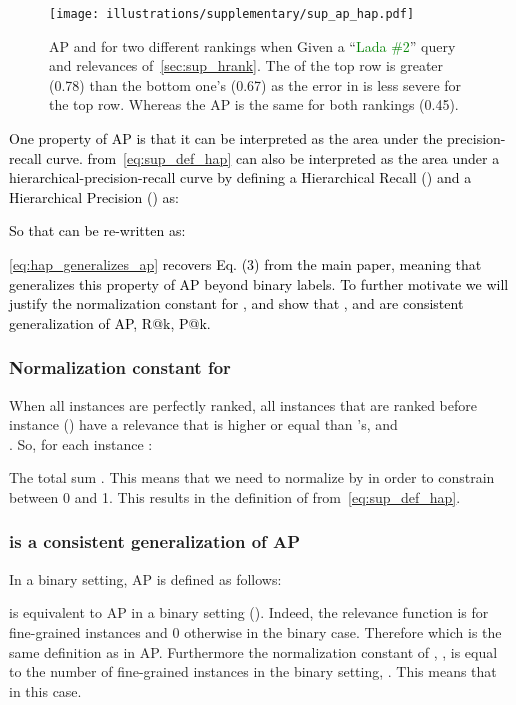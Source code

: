 \begin{figure}[t]
    \centering
    \texttt{[image: illustrations/supplementary/sup\_ap\_hap.pdf]}
    \caption{AP and  for two different rankings when Given a ``\textcolor{Green}{Lada \#2}'' \textcolor{amethyst}{query} and relevances of~\cref{sec:sup_hrank}. The  of the top row is greater (0.78) than the bottom one's (0.67) as the error in  is less severe for the top row. Whereas the AP is the same for both rankings (0.45).}
    \label{fig:sup_dif_ap_hap}
\end{figure}

\medbreak

\textcolor{black}{One property of AP is that it can be interpreted as the area under the precision-recall curve.  from~\cref{eq:sup_def_hap} can also be interpreted as the area under a hierarchical-precision-recall curve by defining a Hierarchical Recall () and a Hierarchical Precision () as:}



\textcolor{black}{So that  can be re-written as:}


\textcolor{black}{\cref{eq:hap_generalizes_ap} recovers Eq. (3) from the main paper, meaning that  generalizes this property of AP beyond binary labels. To further motivate  we will justify the normalization constant for , and show that ,  and  are consistent generalization of AP, R@k, P@k.}


\subsubsection{Normalization constant for } When all instances are perfectly ranked, all instances  that are ranked before instance  () have a relevance that is higher or equal than 's, \ie  and \\ . So, for each instance :


The total sum . This means that we need to normalize by  in order to constrain  between 0 and 1. This results in the definition of  from~\cref{eq:sup_def_hap}.


\subsubsection{ is a consistent generalization of AP} In a binary setting, AP is defined as follows:




 is equivalent to AP in a binary setting (). Indeed, the relevance function is  for fine-grained instances and 0 otherwise in the binary case. Therefore  which is the same definition as  in AP. Furthermore the normalization constant of , , is equal to the number of fine-grained instances in the binary setting, \ie . This means that  in this case.

